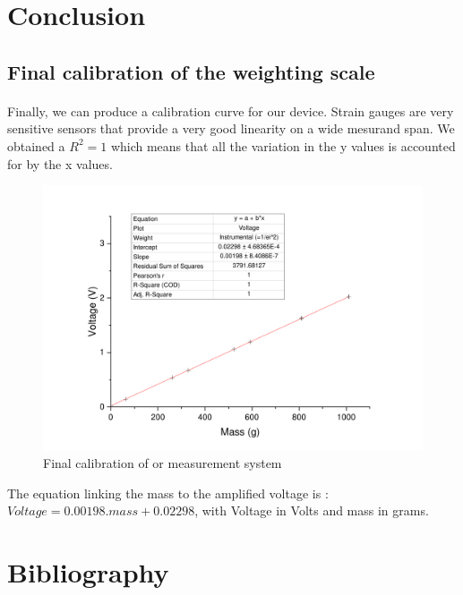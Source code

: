 \documentclass{article}[12pt]
\begin{document}
\section{Conclusion}
\subsection{Final calibration of the weighting scale}
\paragraph{}
Finally, we can produce a calibration curve for our device. Strain gauges are very sensitive sensors that provide a very good linearity on a wide mesurand span. We obtained a $R^2=1$ which means that all the variation in the y values is accounted for by the x values. 
\begin{figure}[H]
    \centering
    \includegraphics[width=.8\textwidth]{figures/calibr.pdf}
    \caption{Final calibration of or measurement system}
    \label{fig:final_calibration}
\end{figure}
The equation linking the mass to the amplified voltage is : $Voltage = 0.00198.mass+0.02298$, with Voltage in Volts and mass in grams.
\newpage
\section{Bibliography}


\end{document}
